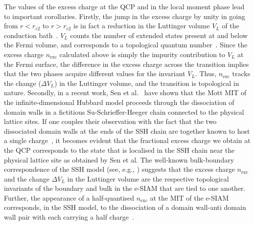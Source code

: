 \documentclass{iopart}
\begin{document}
The values of the excess charge at the QCP and in the local moment phase lead to important corollaries. Firstly, the jump in the excess charge by unity in going from \(r < r_{c2}\) to \(r > r_{c2}\) is in fact a reduction in the Luttinger volume \(V_L\) of the conduction bath~\cite{luttinger1960fermi,martin_1982}. \(V_L\) counts the number of extended states present at and below the Fermi volume, and corresponds to a  topological quantum number~\cite{oshikawa2000topological,seki2017topological,Heath2020,anirbanurg1}. Since the excess charge \(n_\text{exc}\) calculated above is simply the impurity contribution to \(V_L\) at the Fermi surface, the difference in the excess charge across the transition implies that the two phases acquire different values for the invariant \(V_L\). Thus, $n_\text{exc}$ tracks the change ($\Delta V_{L}$) in the Luttinger volume, and the transition is topological in nature. Secondly, in a recent work, Sen et al.~\cite{sen_mitchell_2020} have shown that the Mott MIT of the infinite-dimensional Hubbard model proceeds through the dissociation of domain walls in a fictitious Su-Schrieffer-Heeger chain connected to the physical lattice sites. If one couples their observation with the fact that the two dissociated domain walls at the ends of the SSH chain are together known to host a single charge~\cite{SSHRMP1988,stone_1985}, it becomes evident that the fractional excess charge we obtain at the QCP corresponds to the state that is localised in the SSH chain near the physical lattice site as obtained by Sen et al. The well-known bulk-boundary correspondence of the SSH model (see, e.g., \cite{Asboth_2016}) suggests that the excess charge $n_\text{exc}$ and the change $\Delta V_{L}$ in the Luttinger volume are the respective topological invariants of the boundary and bulk in the e-SIAM that are tied to one another. Further, the appearance of a half-quantised $n_\text{exc}$ at the MIT of the e-SIAM corresponds, in the SSH model, to the dissociation of a domain wall-anti domain wall pair with each carrying a half charge~\cite{SSHRMP1988,stone_1985}.
\end{document}

